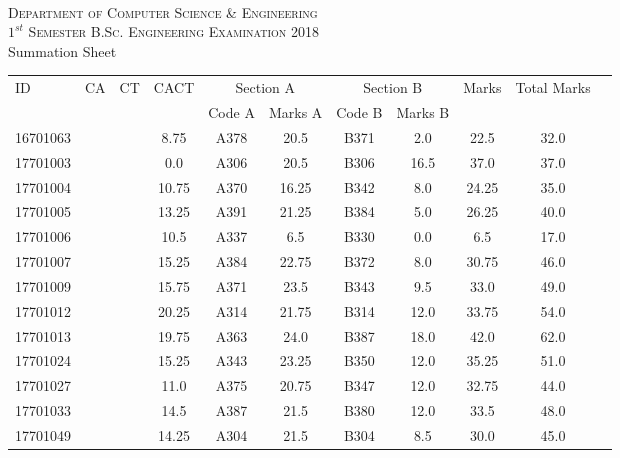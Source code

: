 \documentclass[12pt]{article}
\begin{document}
    \centering
    \begin{minipage}[m]{.8\textwidth} \centering 
	\smallskip
	\\
	\textsc{Department of Computer Science \& Engineering}\\
	\textsc{$1^{st}$ Semester B.Sc. Engineering Examination 2018}\\
	{\large {\sc Summation Sheet}}\\  
    \end{minipage} 
    \begin{center} 
	\renewcommand{\arraystretch}{1.08}
	\begin{small}
    \begin{tabular}{|l|c|c|c|c|c|c|c|c|c|c|} \hline
	\multirow{2}{*}{ID} & 	\multirow{2}{*}{CA}  & 	\multirow{2}{*}{CT}  & 	\multirow{2}{*}{CACT}  & \multicolumn{2 }{|c|}{Section A}& \multicolumn{2 }{c|}{Section B} & 	\multirow{2}{*}{Marks}  & 	\multirow{2}{*}{Total Marks}  \\ 
	&  &  &  & Code A & Marks A & Code B & Marks B&  &  \\ \hline
16701063 &  &  & 8.75 & A378 & 20.5 & B371 & 2.0 & 22.5 & 32.0\\ \hline 
17701003 &  &  & 0.0 & A306 & 20.5 & B306 & 16.5 & 37.0 & 37.0\\ \hline 
17701004 &  &  & 10.75 & A370 & 16.25 & B342 & 8.0 & 24.25 & 35.0\\ \hline 
17701005 &  &  & 13.25 & A391 & 21.25 & B384 & 5.0 & 26.25 & 40.0\\ \hline 
17701006 &  &  & 10.5 & A337 & 6.5 & B330 & 0.0 & 6.5 & 17.0\\ \hline 
17701007 &  &  & 15.25 & A384 & 22.75 & B372 & 8.0 & 30.75 & 46.0\\ \hline 
17701009 &  &  & 15.75 & A371 & 23.5 & B343 & 9.5 & 33.0 & 49.0\\ \hline 
17701012 &  &  & 20.25 & A314 & 21.75 & B314 & 12.0 & 33.75 & 54.0\\ \hline 
17701013 &  &  & 19.75 & A363 & 24.0 & B387 & 18.0 & 42.0 & 62.0\\ \hline 
17701024 &  &  & 15.25 & A343 & 23.25 & B350 & 12.0 & 35.25 & 51.0\\ \hline 
17701027 &  &  & 11.0 & A375 & 20.75 & B347 & 12.0 & 32.75 & 44.0\\ \hline 
17701033 &  &  & 14.5 & A387 & 21.5 & B380 & 12.0 & 33.5 & 48.0\\ \hline 
17701049 &  &  & 14.25 & A304 & 21.5 & B304 & 8.5 & 30.0 & 45.0\\ \hline 

\end{tabular}
\end{small}
\end{center}
\end{document}
